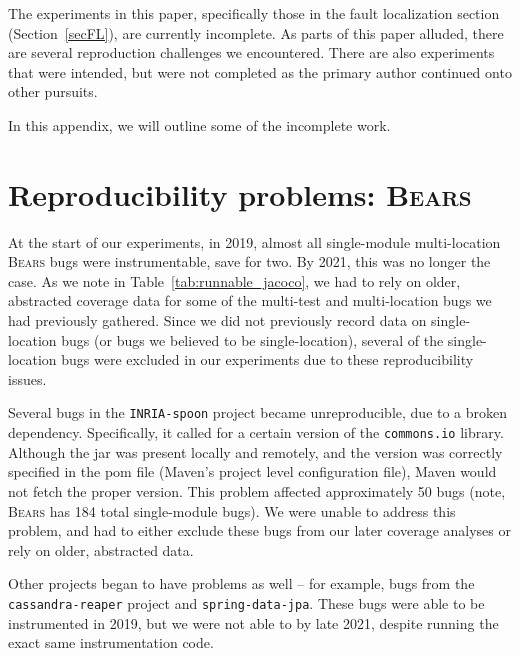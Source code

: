 \documentclass[10pt,journal,compsoc]{IEEEtran}
\newcommand\bears{\textsc{Bears}\xspace}
\begin{document}

The experiments in this paper, specifically those in the fault localization section (Section~\ref{secFL}), 
are currently incomplete.
As parts of this paper alluded, there are several reproduction challenges we encountered.
There are also experiments that were intended, but were not completed as the primary 
author continued onto other pursuits.

In this appendix, we will outline some of the incomplete work.

\section*{Reproducibility problems: \bears}

At the start of our experiments, in 2019, almost all single-module multi-location \bears bugs were instrumentable, 
save for two.
By 2021, this was no longer the case. 
As we note in Table~\ref{tab:runnable_jacoco}, we had to rely on older, abstracted coverage data 
for some of the multi-test and multi-location bugs we had previously gathered.
Since we did not previously record data on single-location bugs (or bugs we believed to be single-location),
several of the single-location bugs were excluded in our experiments due to these 
reproducibility issues.

Several bugs in the \texttt{INRIA-spoon} project became unreproducible, 
due to a broken dependency.
Specifically, it called for a certain version of the \texttt{commons.io} library.
Although the jar was present locally and remotely, 
and the version was correctly specified in the pom file 
(Maven's project level configuration file),
Maven would not fetch the proper version.
This problem affected approximately 50 bugs 
(note, \bears has 184 total single-module bugs).
We were unable to address this problem, and had to either exclude these bugs from our later coverage analyses
or rely on older, abstracted data.

Other projects began to have problems as well -- for example, bugs from the \texttt{cassandra-reaper} project
and \texttt{spring-data-jpa}. 
These bugs were able to be instrumented in 2019, but we were not able to by late 2021, 
despite running the exact same instrumentation code.
\end{document}
